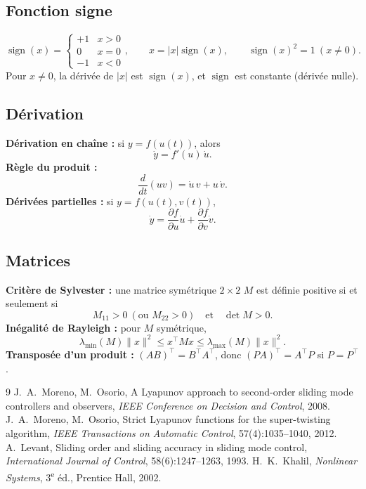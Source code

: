 \documentclass[11pt,a4paper]{article}
\numberwithin{equation}{section}
\theoremstyle{plain}
\theoremstyle{definition}
\theoremstyle{remark}
\newcommand{\sign}{\operatorname{sign}}
\begin{document}
\subsection*{Fonction signe}
\begin{equation}
\sign(x) = \begin{cases}+1 & x>0\\0 & x=0\\-1&x<0\end{cases},\qquad x = |x|\sign(x),\qquad \sign(x)^2=1\ (x\neq0).
\end{equation}
Pour $x\neq0$, la dérivée de $|x|$ est $\sign(x)$, et $\sign$ est constante (dérivée nulle).

\subsection*{Dérivation}
\textbf{Dérivation en chaîne :} si $y=f(u(t))$, alors
\begin{equation}
\dot y = f'(u)\,\dot u .\label{A:chain}
\end{equation}
\textbf{Règle du produit :}
\begin{equation}
\frac{d}{dt}(uv) = \dot u\,v + u\,\dot v .\label{A:prod}
\end{equation}
\textbf{Dérivées partielles :} si $y=f(u(t),v(t))$,
\begin{equation}
\dot y = \frac{\partial f}{\partial u}\dot u + \frac{\partial f}{\partial v}\dot v .
\end{equation}

\subsection*{Matrices}
\textbf{Critère de Sylvester :} une matrice symétrique $2\times2$ $M$ est définie positive si et seulement si
\begin{equation}
M_{11}>0\ (\text{ou } M_{22}>0)\quad\text{et}\quad \det M>0 .\label{A:syl}
\end{equation}
\textbf{Inégalité de Rayleigh :} pour $M$ symétrique,
\begin{equation}
\lambda_{\min}(M)\|x\|^2\le x^\top Mx\le\lambda_{\max}(M)\|x\|^2 .\label{A:ray}
\end{equation}
\textbf{Transposée d'un produit :} $(AB)^\top = B^\top A^\top$, donc $(PA)^\top = A^\top P$ si $P=P^\top$.

\begin{thebibliography}{9}
 J.~A.~Moreno, M.~Osorio, \og A Lyapunov approach to second-order sliding mode
controllers and observers\fg, \emph{IEEE Conference on Decision and Control}, 2008.
 J.~A.~Moreno, M.~Osorio, \og Strict Lyapunov functions for the super-twisting
algorithm\fg, \emph{IEEE Transactions on Automatic Control}, 57(4):1035--1040, 2012.
 A.~Levant, \og Sliding order and sliding accuracy in sliding mode control\fg,
\emph{International Journal of Control}, 58(6):1247--1263, 1993.
 H.~K.~Khalil, \emph{Nonlinear Systems}, 3\textsuperscript{e} éd., Prentice Hall, 2002.
\end{thebibliography}
\end{document}
